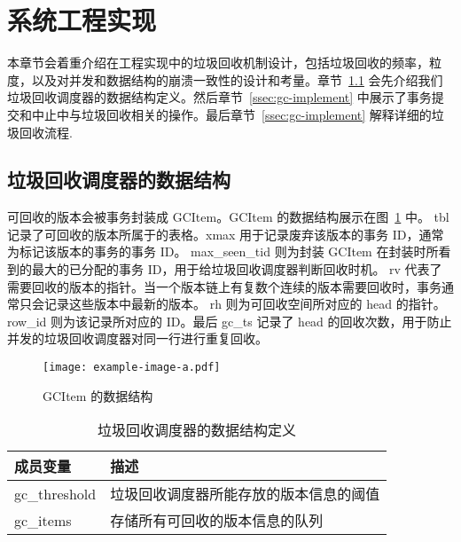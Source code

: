 \section{系统工程实现}
\label{sec:implement}

本章节会着重介绍在工程实现中的垃圾回收机制设计，包括垃圾回收的频率，粒度，以及对并发和数据结构的崩溃一致性的设计和考量。章节~\ref{ssec:gc-metadata} 会先介绍我们垃圾回收调度器的数据结构定义。然后章节~\ref{ssec:gc-implement} 中展示了事务提交和中止中与垃圾回收相关的操作。最后章节~\ref{ssec:gc-implement} 解释详细的垃圾回收流程.

\subsection{垃圾回收调度器的数据结构}
\label{ssec:gc-metadata}


可回收的版本会被事务封装成 GCItem。GCItem 的数据结构展示在图~\ref{fig:gc-item} 中。
tbl 记录了可回收的版本所属于的表格。xmax 用于记录废弃该版本的事务 ID，通常为标记该版本的事务的事务 ID。
max\_seen\_tid 则为封装 GCItem 在封装时所看到的最大的已分配的事务 ID，用于给垃圾回收调度器判断回收时机。
rv 代表了需要回收的版本的指针。当一个版本链上有复数个连续的版本需要回收时，事务通常只会记录这些版本中最新的版本。
rh 则为可回收空间所对应的 head 的指针。row\_id 则为该记录所对应的 ID。最后 gc\_ts 记录了 head 的回收次数，用于防止并发的垃圾回收调度器对同一行进行重复回收。

\begin{figure}
    \centering
    \texttt{[image: example-image-a.pdf]}
    \caption{GCItem 的数据结构}
    \label{fig:gc-item}
\end{figure}

\begin{table}
    \centering
    \caption{垃圾回收调度器的数据结构定义}
    \begin{tabular}{ll}
        \toprule
        成员变量      & 描述                                   \\
        \midrule
        gc\_threshold & 垃圾回收调度器所能存放的版本信息的阈值 \\
        gc\_items     & 存储所有可回收的版本信息的队列         \\
        \bottomrule
    \end{tabular}
    \label{tab:gc-scheduler}
\end{table}


